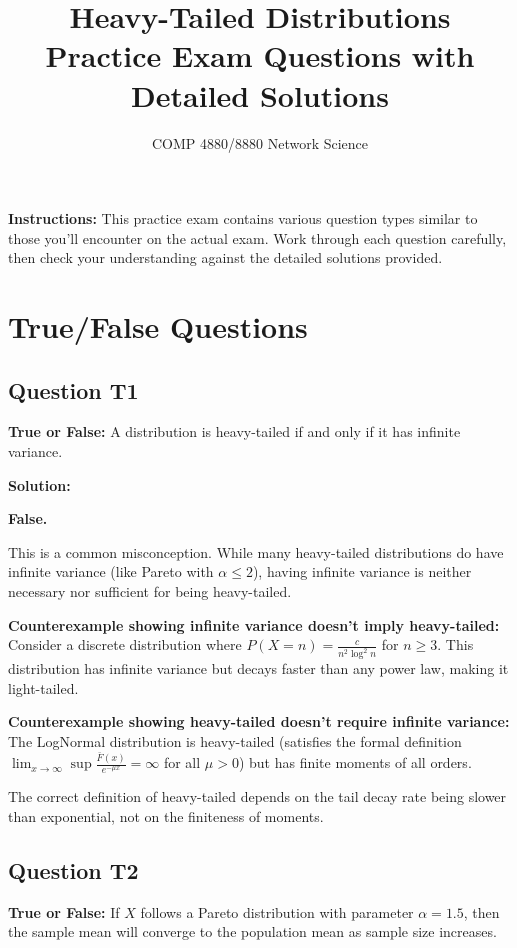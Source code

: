 \documentclass[11pt]{article}
\title{\textbf{Heavy-Tailed Distributions\\Practice Exam Questions with Detailed Solutions}}
\author{COMP 4880/8880 Network Science}
\date{}
\newenvironment{solution}
{\color{solutioncolor}\begin{framed}\textbf{Solution:}\par}
{\end{framed}}
\begin{document}
\maketitle

\textbf{Instructions:} This practice exam contains various question types similar to those you'll encounter on the actual exam. Work through each question carefully, then check your understanding against the detailed solutions provided.

\section{True/False Questions}

\subsection{Question T1}
\textbf{True or False:} A distribution is heavy-tailed if and only if it has infinite variance.

\begin{solution}
\textbf{False.} 

This is a common misconception. While many heavy-tailed distributions do have infinite variance (like Pareto with $\alpha \leq 2$), having infinite variance is neither necessary nor sufficient for being heavy-tailed.

\textbf{Counterexample showing infinite variance doesn't imply heavy-tailed:} Consider a discrete distribution where $P(X = n) = \frac{c}{n^2 \log^2 n}$ for $n \geq 3$. This distribution has infinite variance but decays faster than any power law, making it light-tailed.

\textbf{Counterexample showing heavy-tailed doesn't require infinite variance:} The LogNormal distribution is heavy-tailed (satisfies the formal definition $\lim_{x \to \infty} \sup \frac{\bar{F}(x)}{e^{-\mu x}} = \infty$ for all $\mu > 0$) but has finite moments of all orders.

The correct definition of heavy-tailed depends on the tail decay rate being slower than exponential, not on the finiteness of moments.
\end{solution}

\subsection{Question T2}
\textbf{True or False:} If $X$ follows a Pareto distribution with parameter $\alpha = 1.5$, then the sample mean will converge to the population mean as sample size increases.
\end{document}
